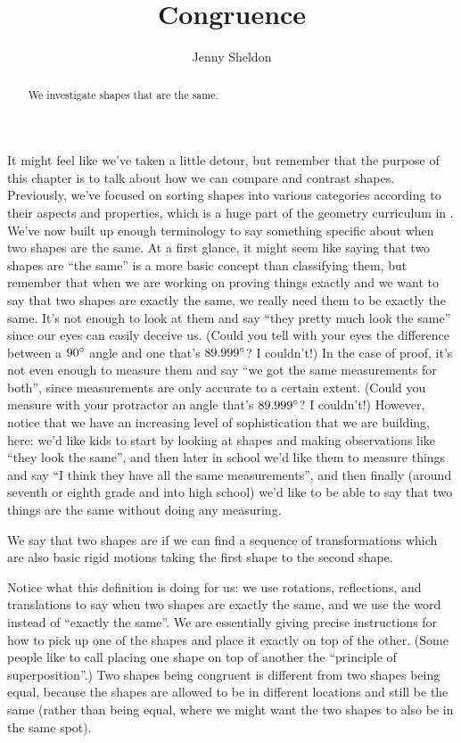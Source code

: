 \documentclass{ximera}
\title{Congruence}
\author{Jenny Sheldon}
\begin{document}
\begin{abstract}
We investigate shapes that are the same.
\end{abstract}
\maketitle

It might feel like we've taken a little detour, but remember that the purpose of this chapter is to talk about how we can compare and contrast shapes. Previously, we've focused on sorting shapes into various categories according to their aspects and properties, which is a huge part of the geometry curriculum in .  We've now built up enough terminology to say something specific about when two shapes are the same. At a first glance, it might seem like saying that two shapes are ``the same'' is a more basic concept than classifying them, but remember that when we are working on proving things exactly and we want to say that two shapes are exactly the same, we really need them to be exactly the same. It's not enough to look at them and say ``they pretty much look the same'' since our eyes can easily deceive us. (Could you tell with your eyes the difference between a $90\degree$ angle and one that's $89.999\degree$? I couldn't!) In the case of proof, it's not even enough to measure them and say ``we got the same measurements for both'', since measurements are only accurate to a certain extent. (Could you measure with your protractor an angle that's $89.999\degree$? I couldn't!) However, notice that we have an increasing level of sophistication that we are building, here: we'd like kids to start by looking at shapes and making observations like ``they look the same'', and then later in school we'd like them to measure things and say ``I think they have all the same measurements'', and then finally (around seventh or eighth grade and into high school) we'd like to be able to say that two things are the same without doing any measuring. 

\begin{definition}
We say that two shapes are  if we can find a sequence of transformations which are also basic rigid motions taking the first shape to the second shape.
\end{definition}
Notice what this definition is doing for us: we use rotations, reflections, and translations to say when two shapes are exactly the same, and we use the word  instead of ``exactly the same''. We are essentially giving precise instructions for how to pick up one of the shapes and place it exactly on top of the other. (Some people like to call placing one shape on top of another the ``principle of superposition''.) Two shapes being congruent is different from two shapes being equal, because the shapes are allowed to be in different locations and still be the same (rather than being equal, where we might want the two shapes to also be in the same spot).
\end{document}
